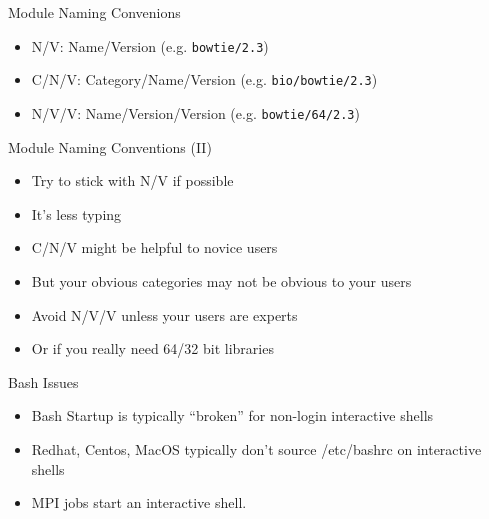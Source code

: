 \documentclass{beamer}
\begin{document}
%

\begin{frame}{Module Naming Convenions}
  \begin{itemize}
    \item N/V:   Name/Version (e.g. \texttt{bowtie/2.3})
    \item C/N/V: Category/Name/Version (e.g. \texttt{bio/bowtie/2.3})
    \item N/V/V: Name/Version/Version (e.g. \texttt{bowtie/64/2.3})
  \end{itemize}
\end{frame}

\begin{frame}{Module Naming Conventions (II)}
  \begin{itemize}
    \item Try to stick with N/V if possible
    \item It's less typing
    \item C/N/V might be helpful to novice users
    \item But your obvious categories may not be obvious to your users
    \item Avoid N/V/V unless your users are experts 
    \item Or if you really need 64/32 bit libraries
  \end{itemize}
\end{frame}

\begin{frame}{Bash Issues}
  \begin{itemize}
    \item Bash Startup is typically ``broken'' for non-login interactive shells
    \item Redhat, Centos, MacOS typically don't source /etc/bashrc on interactive shells
    \item MPI jobs start an interactive shell.
  \end{itemize}
\end{frame}
\end{document}
